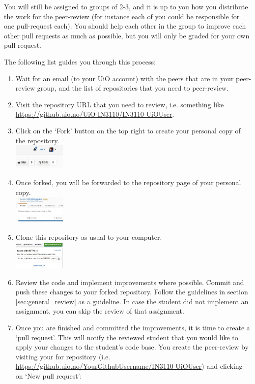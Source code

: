 \documentclass[a4paper]{article}
\begin{document}
You will still be assigned to groups of 2-3, and it is up to you how you distribute the work for the peer-review (for instance each of you could be responsible for one pull-request each). You should help each other in the group to improve each other pull requests as much as possible, but you will only be graded for your own pull request. 

The following list guides you through this process:
\begin{enumerate}
	\item Wait for an email (to your UiO account) with the peers that are in your peer-review group, and the list of repositories that you need to peer-review.
	\item Visit the repository URL that you need to review, i.e. something like \\ \url{https://github.uio.no/UiO-IN3110/IN3110-UiOUser}.
\item Click on the `Fork' button on the top right to create your personal copy of the repository. 
\\
\includegraphics[width=0.2\textwidth]{Selection_001}
\item Once forked, you will be forwarded to the repository page of your personal copy.
\\
\includegraphics[width=0.2\textwidth]{Selection_003}
\item Clone this repository as usual to your computer.
\\
\includegraphics[width=0.2\textwidth]{Selection_005}
\item Review the code and implement improvements where possible. Commit and push these changes to your forked repository. Follow the guidelines in section \ref{sec:general_review} as a guideline. In case the student did not implement an assignment, you can skip the review of that assignment. 
\\
\item Once you are finished and committed the improvements, it is time to create a `pull request'. This will notify the reviewed student that you would like to apply your changes to the student's code base. You create the peer-review by visiting your for repository (i.e. \url{https://github.uio.no/YourGithubUsername/IN3110-UiOUser}) and clicking on `New pull request':

\end{enumerate}
\end{document}
